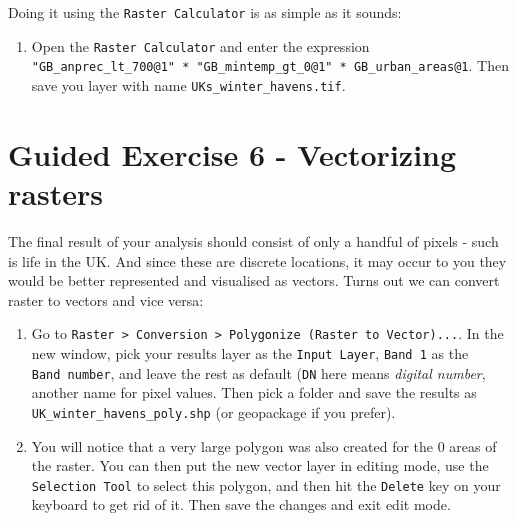 \documentclass[
  letterpaper,
  DIV=11,
  numbers=noendperiod]{scrreprt}
\providecommand{\tightlist}{%
  \setlength{\itemsep}{0pt}\setlength{\parskip}{0pt}}\usepackage{longtable,booktabs,array}
\begin{document}
Doing it using the \texttt{Raster\ Calculator} is as simple as it
sounds:

\begin{enumerate}
\def\labelenumi{(\arabic{enumi})}
\setcounter{enumi}{171}
\tightlist
\item
  Open the \texttt{Raster\ Calculator} and enter the expression
  \texttt{"GB\_anprec\_lt\_700@1"\ *\ "GB\_mintemp\_gt\_0@1"\ *\ GB\_urban\_areas@1}.
  Then save you layer with name \texttt{UKs\_winter\_havens.tif}.
\end{enumerate}

\section{Guided Exercise 6 - Vectorizing
rasters}\label{guided-exercise-6---vectorizing-rasters}

The final result of your analysis should consist of only a handful of
pixels - such is life in the UK. And since these are discrete locations,
it may occur to you they would be better represented and visualised as
vectors. Turns out we can convert raster to vectors and vice versa:

\begin{enumerate}
\def\labelenumi{(\arabic{enumi})}
\setcounter{enumi}{172}
\item
  Go to
  \texttt{Raster\ \textgreater{}\ Conversion\ \textgreater{}\ Polygonize\ (Raster\ to\ Vector)...}.
  In the new window, pick your results layer as the
  \texttt{Input\ Layer}, \texttt{Band\ 1} as the \texttt{Band\ number},
  and leave the rest as default (\texttt{DN} here means \emph{digital
  number}, another name for pixel values. Then pick a folder and save
  the results as \texttt{UK\_winter\_havens\_poly.shp} (or geopackage if
  you prefer).
\item
  You will notice that a very large polygon was also created for the 0
  areas of the raster. You can then put the new vector layer in editing
  mode, use the \texttt{Selection\ Tool} to select this polygon, and
  then hit the \texttt{Delete} key on your keyboard to get rid of it.
  Then save the changes and exit edit mode.
\end{enumerate}
\end{document}
